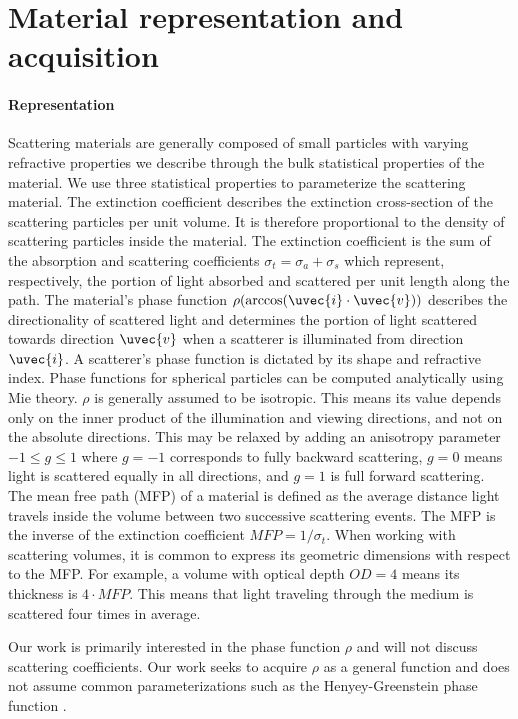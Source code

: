 \section{Material representation and acquisition}

\paragraph{Representation} Scattering materials are generally composed of small particles with varying refractive properties we describe through the bulk statistical properties of the material. We use three statistical properties to parameterize the scattering material. The extinction coefficient describes the extinction cross-section of the scattering particles per unit volume. It is therefore proportional to the density of scattering particles inside the material. The extinction coefficient is the sum of the absorption and scattering coefficients $\sigma_t = \sigma_a + \sigma_s$ which represent, respectively, the portion of light absorbed and scattered per unit length along the path. The material's phase function $\rho(\arccos(\uvec{i} \cdot \uvec{v}))$ describes the directionality of scattered light and determines the portion of light scattered towards direction $\uvec{v}$ when a scatterer is illuminated from direction $\uvec{i}$. A scatterer's phase function is dictated by its shape and refractive index. Phase functions for spherical particles can be computed analytically using Mie theory\cite{bohren2008absorption, frisvad2007computing, hulst1981light}. $\rho$ is generally assumed to be isotropic. This means its value depends only on the inner product of the illumination and viewing directions, and not on the absolute directions. This may be relaxed by adding an anisotropy parameter $-1 \leq g \leq 1$ where $g=-1$ corresponds to fully backward scattering, $g=0$ means light is scattered equally in all directions, and $g=1$ is full forward scattering. The mean free path (MFP) of a material is defined as the average distance light travels inside the volume between two successive scattering events. The MFP is the inverse of the extinction coefficient $MFP=1/\sigma_t$. When working with scattering volumes, it is common to express its geometric dimensions with respect to the MFP. For example, a volume with optical depth $OD = 4$ means its thickness is $4 \cdot MFP$. This means that light traveling through the medium is scattered four times in average.

Our work is primarily interested in the phase function $\rho$ and will not discuss scattering coefficients. Our work seeks to acquire $\rho$ as a general function and does not assume common parameterizations such as the Henyey-Greenstein phase function \cite{henyey1940diffuse}.


